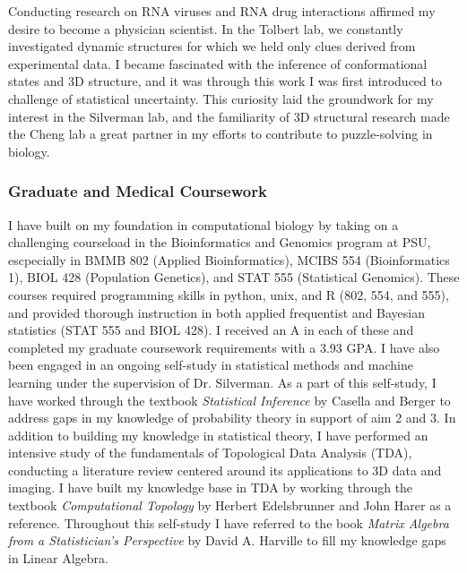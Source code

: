\documentclass{NIHGrant}
\begin{document}
Conducting research on RNA viruses and RNA drug interactions affirmed my desire to become a physician scientist. In the Tolbert lab, we constantly investigated dynamic structures for which we held only clues derived from experimental data. I became fascinated with the inference of conformational states and 3D structure, and it was through this work I was first introduced to challenge of statistical uncertainty. This curiosity laid the groundwork for my interest in the Silverman lab, and the familiarity of 3D structural research made the Cheng lab a great partner in my efforts to contribute to puzzle-solving in biology.

\subsubsection*{Graduate and Medical Coursework}
I have built on my foundation in computational biology by taking on a challenging courseload in the Bioinformatics and Genomics program at PSU, escpecially in BMMB 802 (Applied Bioinformatics), MCIBS 554 (Bioinformatics 1), BIOL 428 (Population Genetics), and STAT 555 (Statistical Genomics). These courses required programming skills in python, unix, and R (802, 554, and 555), and provided thorough instruction in both applied frequentist and Bayesian statistics (STAT 555 and BIOL 428). I received an A in each of these and completed my graduate coursework requirements with a 3.93 GPA. I have also been engaged in an ongoing self-study in statistical methods and machine learning under the supervision of Dr. Silverman. As a part of this self-study, I have worked through the textbook \textit{Statistical Inference} by Casella and Berger to address gaps in my knowledge of probability theory in support of aim 2 and 3. In addition to building my knowledge in statistical theory, I have performed an intensive study of the fundamentals of Topological Data Analysis (TDA), conducting a literature review centered around its applications to 3D data and imaging. I have built my knowledge base in TDA by working through the textbook \textit{Computational Topology} by Herbert Edelsbrunner and John Harer as a reference. Throughout this self-study I have referred to the book \textit{Matrix Algebra from a Statistician's Perspective} by David A. Harville to fill my knowledge gaps in Linear Algebra.
\end{document}
